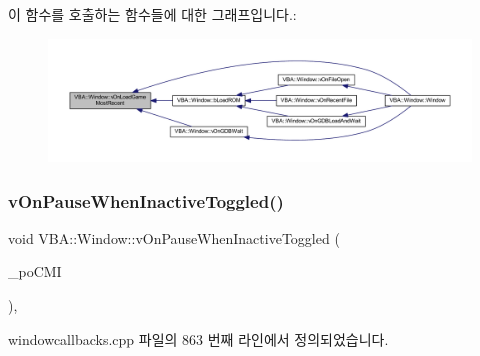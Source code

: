 이 함수를 호출하는 함수들에 대한 그래프입니다.\+:
\nopagebreak
\begin{figure}[H]
\begin{center}
\leavevmode
\includegraphics[width=350pt]{class_v_b_a_1_1_window_ac73a836767434700186832ae1ea49cc5_icgraph}
\end{center}
\end{figure}
\mbox{\label{class_v_b_a_1_1_window_aec8ba72231d668912f3b71353925f2f2}} 
\subsubsection{\texorpdfstring{v\+On\+Pause\+When\+Inactive\+Toggled()}{vOnPauseWhenInactiveToggled()}}
{\footnotesize\ttfamily void V\+B\+A\+::\+Window\+::v\+On\+Pause\+When\+Inactive\+Toggled (\begin{DoxyParamCaption}\item[{Gtk\+::\+Check\+Menu\+Item $\ast$}]{\+\_\+po\+C\+MI }\end{DoxyParamCaption})\hspace{0.3cm}{\ttfamily [protected]}, {\ttfamily [virtual]}}



windowcallbacks.\+cpp 파일의 863 번째 라인에서 정의되었습니다.


